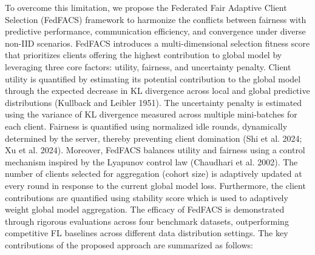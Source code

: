 \documentclass[pdflatex,sn-mathphys-num,oneside]{sn-jnl}%
\theoremstyle{thmstyleone}%
\theoremstyle{thmstyletwo}%
\theoremstyle{thmstylethree}%
\begin{document}
To overcome this limitation, we propose the Federated Fair Adaptive Client Selection (FedFACS) framework to harmonize the conflicts between fairness with predictive performance, communication efficiency, and convergence under diverse non-IID scenarios. FedFACS introduces a multi-dimensional selection fitness score that prioritizes clients offering the highest contribution to global model by leveraging three core factors: utility, fairness, and uncertainty penalty. Client utility is quantified by estimating its potential contribution to the global model through the expected decrease in KL divergence across local and global predictive distributions (Kullback and Leibler 1951). The uncertainty penalty is estimated using the variance of KL divergence measured across multiple mini-batches for each client. Fairness is quantified using normalized idle rounds, dynamically determined by the server, thereby preventing client domination (Shi et al. 2024; Xu et al. 2024). Moreover, FedFACS balances utility and fairness using a control mechanism inspired by the Lyapunov control law (Chaudhari et al. 2002). The number of clients selected for aggregation (cohort size) is adaptively updated at every round in response to the current global model loss. Furthermore, the client contributions are quantified using stability score which is used to adaptively weight global model aggregation. The efficacy of FedFACS is demonstrated through rigorous evaluations across four benchmark datasets, outperforming competitive FL baselines across different data distribution settings. The key contributions of the proposed approach are summarized as follows:
\end{document}
